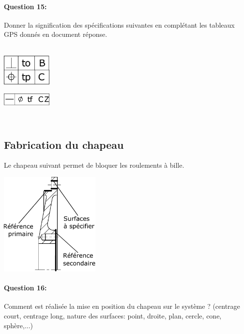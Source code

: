\paragraph{Question 15:} Donner la signification des spécifications suivantes en complétant les tableaux GPS donnés en document réponse.
\\ ~\ \\
\begin{minipage}{0.45\linewidth}
\centering\includegraphics[width=2.5cm]{img/specif1}
\end{minipage}\hfill
\begin{minipage}{0.45\linewidth}
\centering\includegraphics[width=2.5cm]{img/specif2}
\end{minipage} ~\ \\

\subsection{Fabrication du chapeau}

Le chapeau suivant permet de bloquer les roulements à bille. ~\ \\

\begin{center}
 \includegraphics[width=5cm]{img/specif3}
\end{center}\hfill

\paragraph{Question 16:} Comment est réalisée la mise en position du chapeau sur le système ? (centrage court, centrage long, nature des surfaces: point, droite, plan, cercle, cone, sphère,...)

